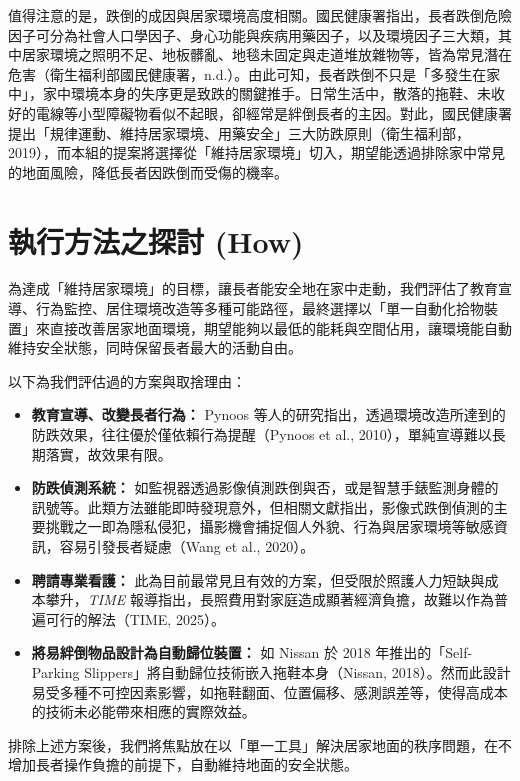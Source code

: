 \documentclass[12pt]{article}
\begin{document}
值得注意的是，跌倒的成因與居家環境高度相關。國民健康署指出，長者跌倒危險因子可分為社會人口學因子、身心功能與疾病用藥因子，以及環境因子三大類，其中居家環境之照明不足、地板髒亂、地毯未固定與走道堆放雜物等，皆為常見潛在危害（衛生福利部國民健康署，n.d.）。由此可知，長者跌倒不只是「多發生在家中」，家中環境本身的失序更是致跌的關鍵推手。日常生活中，散落的拖鞋、未收好的電線等小型障礙物看似不起眼，卻經常是絆倒長者的主因。對此，國民健康署提出「規律運動、維持居家環境、用藥安全」三大防跌原則（衛生福利部，2019），而本組的提案將選擇從「維持居家環境」切入，期望能透過排除家中常見的地面風險，降低長者因跌倒而受傷的機率。

\section{執行方法之探討 (How)}
為達成「維持居家環境」的目標，讓長者能安全地在家中走動，我們評估了教育宣導、行為監控、居住環境改造等多種可能路徑，最終選擇以「單一自動化拾物裝置」來直接改善居家地面環境，期望能夠以最低的能耗與空間佔用，讓環境能自動維持安全狀態，同時保留長者最大的活動自由。

以下為我們評估過的方案與取捨理由：

\begin{itemize}
  \setlength{\leftmargin}{2em}
  \setlength{\itemsep}{0.5em}
  \item \textbf{教育宣導、改變長者行為：} Pynoos 等人的研究指出，透過環境改造所達到的防跌效果，往往優於僅依賴行為提醒（Pynoos et al., 2010），單純宣導難以長期落實，故效果有限。
  \item \textbf{防跌偵測系統：} 如監視器透過影像偵測跌倒與否，或是智慧手錶監測身體的訊號等。此類方法雖能即時發現意外，但相關文獻指出，影像式跌倒偵測的主要挑戰之一即為隱私侵犯，攝影機會捕捉個人外貌、行為與居家環境等敏感資訊，容易引發長者疑慮（Wang et al., 2020）。
  \item \textbf{聘請專業看護：} 此為目前最常見且有效的方案，但受限於照護人力短缺與成本攀升，\textit{TIME} 報導指出，長照費用對家庭造成顯著經濟負擔，故難以作為普遍可行的解法（TIME, 2025）。
  \item \textbf{將易絆倒物品設計為自動歸位裝置：} 如 Nissan 於 2018 年推出的「Self-Parking Slippers」將自動歸位技術嵌入拖鞋本身（Nissan, 2018）。然而此設計易受多種不可控因素影響，如拖鞋翻面、位置偏移、感測誤差等，使得高成本的技術未必能帶來相應的實際效益。
\end{itemize}

排除上述方案後，我們將焦點放在以「單一工具」解決居家地面的秩序問題，在不增加長者操作負擔的前提下，自動維持地面的安全狀態。
\end{document}
